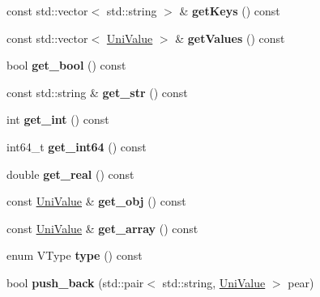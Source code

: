 \begin{DoxyCompactItemize}
\mbox{\label{class_uni_value_a67e4178f582aa9f7bc39e71066ad786e}} 
const std\+::vector$<$ std\+::string $>$ \& {\bfseries get\+Keys} () const
\item 
\mbox{\label{class_uni_value_a60de76689de98b6c97ca723e280becf8}} 
const std\+::vector$<$ \mbox{\hyperlink{class_uni_value}{Uni\+Value}} $>$ \& {\bfseries get\+Values} () const
\item 
\mbox{\label{class_uni_value_ae8a27d40aa1b1322ea95ff4fb2dec2b1}} 
bool {\bfseries get\+\_\+bool} () const
\item 
\mbox{\label{class_uni_value_a087ea6ccec615333371fa1aaf83ab7df}} 
const std\+::string \& {\bfseries get\+\_\+str} () const
\item 
\mbox{\label{class_uni_value_af45edc6e67eaa6d1f271ce18e435a376}} 
int {\bfseries get\+\_\+int} () const
\item 
\mbox{\label{class_uni_value_a34bd3bc2de335486d2060ff907b317d0}} 
int64\+\_\+t {\bfseries get\+\_\+int64} () const
\item 
\mbox{\label{class_uni_value_ae767e3e162b24c182aab4706f63a45f1}} 
double {\bfseries get\+\_\+real} () const
\item 
\mbox{\label{class_uni_value_a49a6ac464f3c2d918e7379d3203c7337}} 
const \mbox{\hyperlink{class_uni_value}{Uni\+Value}} \& {\bfseries get\+\_\+obj} () const
\item 
\mbox{\label{class_uni_value_aa9751b5797cb84d15b9fe4ca217f0b63}} 
const \mbox{\hyperlink{class_uni_value}{Uni\+Value}} \& {\bfseries get\+\_\+array} () const
\item 
\mbox{\label{class_uni_value_a5b33bfd4be1574e610eee5a7cdae77d1}} 
enum V\+Type {\bfseries type} () const
\item 
\mbox{\label{class_uni_value_a2f13b56d2d214c71bb737728c432dccb}} 
bool {\bfseries push\+\_\+back} (std\+::pair$<$ std\+::string, \mbox{\hyperlink{class_uni_value}{Uni\+Value}} $>$ pear)
\end{DoxyCompactItemize}
